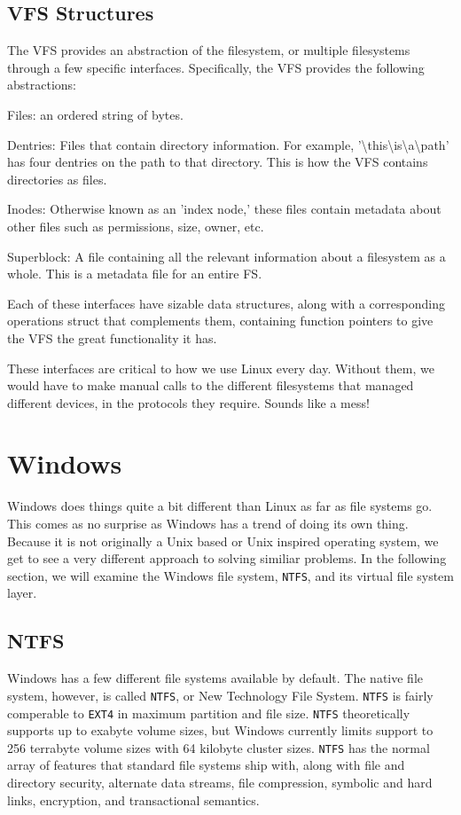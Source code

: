   \subsection{VFS Structures}
  The VFS provides an abstraction of the filesystem, or multiple filesystems
  through a few specific interfaces. Specifically, the VFS provides the
  following abstractions:
  \begin{description}
    \item Files: an ordered string of bytes.
    \item Dentries: Files that contain directory information. For example,
    '\textbackslash this\textbackslash is\textbackslash a\textbackslash path'
    has four dentries on the path to that directory. This is how the VFS contains
    directories as files.
    \item Inodes: Otherwise known as an 'index node,' these files contain metadata
    about other files such as permissions, size, owner, etc.
    \item Superblock: A file containing all the relevant information about a filesystem
    as a whole. This is a metadata file for an entire FS.
  \end{description}

  Each of these interfaces have sizable data structures, along with a corresponding
  operations struct that complements them, containing function pointers to give the
  VFS the great functionality it has.\cite{robertlove2010}

  These interfaces are critical to how we use Linux every day. Without them, we
  would have to make manual calls to the different filesystems that managed different
  devices, in the protocols they require. Sounds like a mess!

\section{Windows}
Windows does things quite a bit different than Linux as far as file systems go.
This comes as no surprise as Windows has a trend of doing its own thing. Because
it is not originally a Unix based or Unix inspired operating system, we get to
see a very different approach to solving similiar problems. In the following
section, we will examine the Windows file system, \texttt{NTFS}, and its virtual
file system layer.
  \subsection{NTFS}
  Windows has a few different file systems available by default. The native file
  system, however, is called \texttt{NTFS}, or New Technology File System.
  \texttt{NTFS} is fairly comperable to \texttt{EXT4} in maximum partition and
  file size. \texttt{NTFS} theoretically supports up to exabyte volume sizes, but
  Windows currently limits support to 256 terrabyte volume sizes with 64 kilobyte
  cluster sizes. \texttt{NTFS} has the normal array of features that standard file
  systems ship with, along with file and directory security, alternate data streams,
  file compression, symbolic and hard links, encryption, and transactional semantics.
  \cite{internals2}
